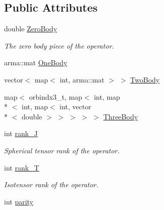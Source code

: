 \subsection*{Public Attributes}
\begin{DoxyCompactItemize}
\item 
\hypertarget{classOperator_a2f9f1109333a2485083cc7c090f9cd26}{double \hyperlink{classOperator_a2f9f1109333a2485083cc7c090f9cd26}{Zero\-Body}}\label{classOperator_a2f9f1109333a2485083cc7c090f9cd26}

\begin{DoxyCompactList}\small\item\em The zero body piece of the operator. \end{DoxyCompactList}\item 
arma\-::mat \hyperlink{classOperator_a14b1c78e0be45772aa57168c74d1b57c}{One\-Body}
\item 
vector$<$ map$<$ int, arma\-::mat $>$ $>$ \hyperlink{classOperator_a0778ed6b9b7b47e34f11fa187189c943}{Two\-Body}
\item 
map$<$ orbindx3\-\_\-t, map$<$ int, map\\*
$<$ int, map$<$ int, vector\\*
$<$ double $>$ $>$ $>$ $>$ $>$ \hyperlink{classOperator_a2f3d3ccaa254194b81442fe01c39160d}{Three\-Body}
\item 
\hypertarget{classOperator_a71a7c194800e2758c42ad0d5f30299aa}{int \hyperlink{classOperator_a71a7c194800e2758c42ad0d5f30299aa}{rank\-\_\-\-J}}\label{classOperator_a71a7c194800e2758c42ad0d5f30299aa}

\begin{DoxyCompactList}\small\item\em Spherical tensor rank of the operator. \end{DoxyCompactList}\item 
\hypertarget{classOperator_ac70ee8dbbc4cb4f61972575c68bb9a51}{int \hyperlink{classOperator_ac70ee8dbbc4cb4f61972575c68bb9a51}{rank\-\_\-\-T}}\label{classOperator_ac70ee8dbbc4cb4f61972575c68bb9a51}

\begin{DoxyCompactList}\small\item\em Isotensor rank of the operator. \end{DoxyCompactList}\item 
\hypertarget{classOperator_ad628e91e2dd2542c0f34e985271adcd3}{int \hyperlink{classOperator_ad628e91e2dd2542c0f34e985271adcd3}{parity}}\label{classOperator_ad628e91e2dd2542c0f34e985271adcd3}


\end{DoxyCompactItemize}
